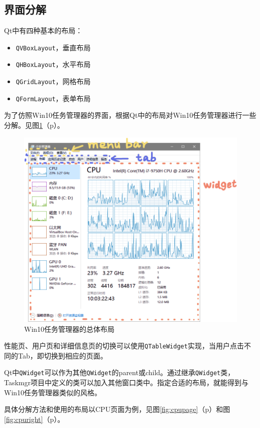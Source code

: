 \documentclass[UTF8,twoside,titlepage]{ctexart}
\newcommand\code[1]{\texttt{#1}}
\newcommand\myref[1]{\ref{#1}（p\pageref{#1}）}
\begin{document}
\subsection{界面分解}
Qt中有四种基本的布局：

\begin{itemize}
    \item \code{QVBoxLayout}，垂直布局
    \item \code{QHBoxLayout}，水平布局
    \item \code{QGridLayout}，网格布局
    \item \code{QFormLayout}，表单布局
\end{itemize}

为了仿照Win10任务管理器的界面，根据Qt中的布局对Win10任务管理器进行一些分解。见图\myref{fig:layout}。

\begin{figure}[htb]
    \centering
    \includegraphics[scale=0.5]{../media/layout/总体布局_2.png}
    \caption{Win10任务管理器的总体布局}
    \label{fig:layout}
\end{figure}

性能页、用户页和详细信息页的切换可以使用\code{QTableWidget}实现，当用户点击不同的Tab，即切换到相应的页面。

Qt中\code{QWidget}可以作为其他\code{QWidget}的parent或child。通过继承\code{QWidget}类，Taskmgr项目中定义的类可以加入其他窗口类中。指定合适的布局，就能得到与Win10任务管理器类似的风格。

具体分解方法和使用的布局以CPU页面为例，见图\myref{fig:cpupage}和图\myref{fig:cpuright}。
\end{document}
